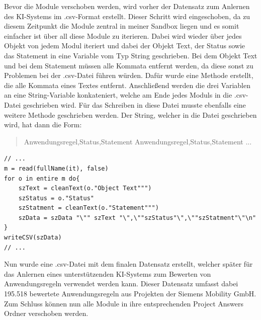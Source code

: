 Bevor die Module verschoben werden, wird vorher der Datensatz zum Anlernen des KI-Systems im .csv-Format erstellt. Dieser
Schritt wird eingeschoben, da zu diesem Zeitpunkt die Module zentral in meiner Sandbox liegen und es somit einfacher ist über all diese Module zu iterieren. Dabei wird wieder über jedes Objekt
von jedem Modul iteriert und dabei der Objekt Text, der Status sowie das Statement in eine Variable vom Typ String geschrieben. Bei dem Objekt Text und bei dem Statement müssen alle Kommata entfernt
werden, da diese sonst zu Problemen bei der .csv-Datei führen würden. Dafür wurde eine Methode erstellt, die alle Kommata eines Textes entfernt. Anschließend werden die drei Variablen an eine
String-Variable konkateniert, welche am Ende jedes Moduls in die .csv-Datei geschrieben wird. Für das Schreiben in diese Datei musste ebenfalls eine weitere Methode geschrieben werden. 
Der String, welcher in die Datei geschrieben wird, hat dann die Form:

\begin{quotation}
    \noindent
    \dq Anwendungsregel\dq,\dq Status\dq,\dq Statement\dq \linebreak
    \dq Anwendungsregel\dq,\dq Status\dq,\dq Statement\dq \linebreak
    ...
\end{quotation}

\begin{lstlisting}[caption={Daten in eine .csv-Datei schreiben}, captionpos=b, label = lst:writeCSV]
// ...
m = read(fullName(it), false)
for o in entire m do{
    szText = cleanText(o."Object Text""")
    szStatus = o."Status"
    szStatment = cleanText(o."Statement""")
    szData = szData "\"" szText "\",\""szStatus"\",\""szStatment"\"\n"
}
writeCSV(szData)
// ...
\end{lstlisting}

Nun wurde eine .csv-Datei mit dem finalen Datensatz erstellt, welcher später für das Anlernen eines unterstützenden KI-Systems zum Bewerten von Anwendungsregeln verwendet werden kann.
Dieser Datensatz umfasst dabei 195.518 bewertete Anwendungsregeln aus Projekten der Siemens Mobility GmbH. Zum Schluss können nun alle Module in ihre entsprechenden Project Answers Ordner 
verschoben werden. 
